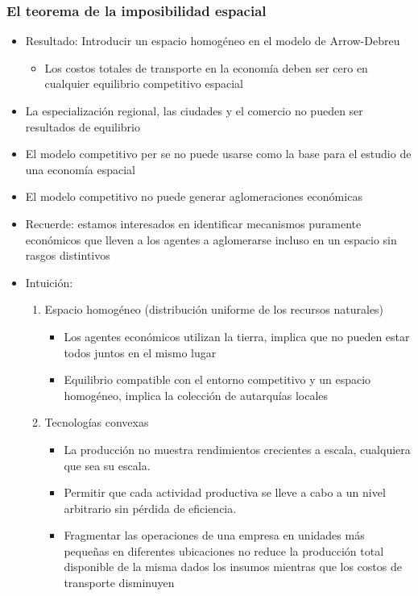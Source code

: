 \subsubsection{El teorema de la imposibilidad espacial}
\begin{itemize}
    \item Resultado: Introducir un espacio homogéneo en el modelo de Arrow-Debreu 
	\begin{itemize}
	    \item Los costos totales de transporte en la economía deben ser cero en cualquier equilibrio competitivo espacial 
	\end{itemize}
    \item La especialización regional, las ciudades y el comercio no pueden ser resultados de equilibrio 
    \item El modelo competitivo per se no puede usarse como la base para el estudio de una economía espacial
    \item El modelo competitivo no puede generar aglomeraciones económicas 
    \item Recuerde: estamos interesados en identificar mecanismos puramente económicos que lleven a los agentes a aglomerarse incluso en un espacio sin rasgos distintivos
    \item Intuición: 
	\begin{enumerate}
	    \item Espacio homogéneo (distribución uniforme de los recursos naturales)
	    \begin{itemize}
		\item Los agentes económicos utilizan la tierra,  implica que no pueden estar todos juntos en el mismo lugar 
		\item Equilibrio compatible con el entorno competitivo y un espacio homogéneo, implica  la colección de autarquías locales 
	    \end{itemize}
	    \item  Tecnologías convexas 
		\begin{itemize}
		    \item La producción no muestra rendimientos crecientes a escala, cualquiera que sea su escala. 
		    \item Permitir que cada actividad productiva se lleve a cabo a un nivel arbitrario sin pérdida de eficiencia. 
		    \item Fragmentar las operaciones de una empresa en unidades más pequeñas en diferentes ubicaciones no reduce la producción total disponible de la misma dados los insumos mientras que los costos de transporte disminuyen

\end{itemize}
\end{enumerate}
\end{itemize}
